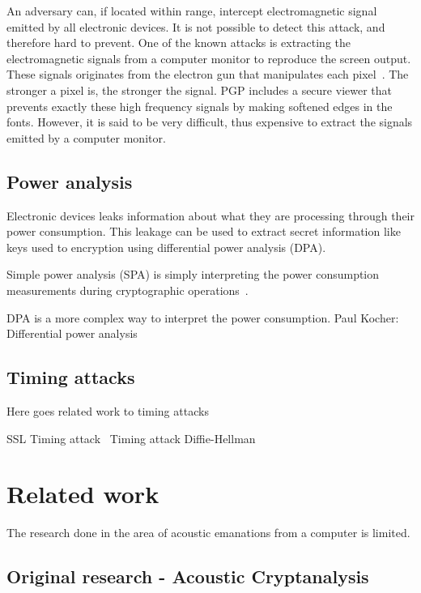 An adversary can, if located within range, intercept electromagnetic signal emitted by all electronic devices. 
It is not possible to detect this attack, and therefore hard to prevent. 
One of the known attacks is extracting the electromagnetic signals from a computer monitor to reproduce the screen output.
These signals originates from the electron gun that manipulates each pixel~\cite{url:tempest_sans}. 
The stronger a pixel is, the stronger the signal.
PGP includes a secure viewer that prevents exactly these high frequency signals by making softened edges in the fonts.
However, it is said to be very difficult, thus expensive to extract the signals emitted by a computer monitor. 

\subsection{Power analysis}\label{chp2:subsec:power_analysis}

Electronic devices leaks information about what they are processing through their power consumption.
This leakage can be used to extract secret information like keys used to encryption using differential power analysis (DPA). 

Simple power analysis (SPA) is simply interpreting the power consumption measurements during cryptographic operations~\cite{DBLP:conf/crypto/KocherJJ99}. 

DPA is a more complex way to interpret the power consumption. 
Paul Kocher: Differential power analysis~\cite{DBLP:conf/crypto/KocherJJ99}

\subsection{Timing attacks}\label{chp2:subsec:timing_attacks}

Here goes related work to timing attacks

SSL Timing attack~\cite{DBLP:conf/esorics/BrumleyT11}
Timing attack Diffie-Hellman~\cite{DBLP:conf/crypto/Kocher96}


\section{Related work}\label{chp2:sec:related_work}

The research done in the area of acoustic emanations from a computer is limited. 

\subsection{Original research - Acoustic Cryptanalysis}\label{chp2:subsec:original_research}

